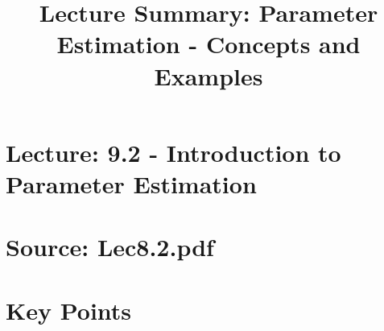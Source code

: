 \documentclass{article}
\title{Lecture Summary: Parameter Estimation - Concepts and Examples}
\author{}
\date{}
\begin{document}
\maketitle

\section*{Lecture: 9.2 - Introduction to Parameter Estimation}
\section*{Source: Lec8.2.pdf}

\section*{Key Points}
\end{document}
